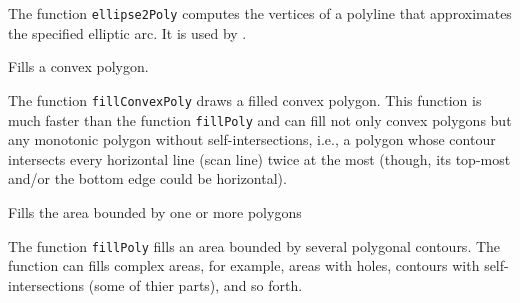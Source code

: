 The function \texttt{ellipse2Poly} computes the vertices of a polyline that approximates the specified elliptic arc. It is used by .

Fills a convex polygon.

\begin{description}
\end{description}

The function \texttt{fillConvexPoly} draws a filled convex polygon.
This function is much faster than the function \texttt{fillPoly}
and can fill not only convex polygons but any monotonic polygon without self-intersections,
i.e., a polygon whose contour intersects every horizontal line (scan
line) twice at the most (though, its top-most and/or the bottom edge could be horizontal).

Fills the area bounded by one or more polygons

\begin{description}
\end{description}

The function \texttt{fillPoly} fills an area bounded by several
polygonal contours. The function can fills complex areas, for example,
areas with holes, contours with self-intersections (some of thier parts), and so forth.

